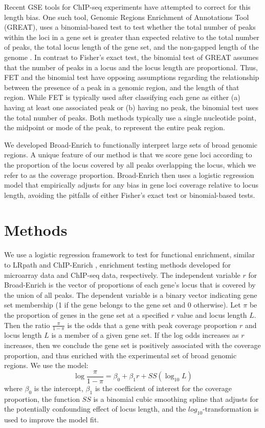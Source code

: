 \documentclass[11pt, oneside]{article}   	%
\begin{document}
Recent GSE tools for ChIP-seq experiments have attempted to correct for this length bias. One such tool, Genomic Regions Enrichment of Annotations Tool (GREAT), uses a binomial-based test to test whether the total number of peaks within the loci in a gene set is greater than expected relative to the total number of peaks, the total locus length of the gene set, and the non-gapped length of the genome \cite{McLean:2010iq}. In contrast to Fisher's exact test, the binomial test of GREAT assumes that the number of peaks in a locus and the locus length are proportional. Thus, FET and the binomial test have opposing assumptions regarding the relationship between the presence of a peak in a genomic region, and the length of that region. While FET is typically used after classifying each gene as either (a) having at least one associated peak or (b) having no peak, the binomial test uses the total number of peaks. Both methods typically use a single nucleotide point, the midpoint or mode of the peak, to represent the entire peak region.

We developed Broad-Enrich to functionally interpret large sets of broad genomic regions. A unique feature of our method is that we score gene loci according to the proportion of the locus covered by all peaks overlapping the locus, which we refer to as the coverage proportion. Broad-Enrich then uses a logistic regression model that empirically adjusts for any bias in gene loci coverage relative to locus length, avoiding the pitfalls of either Fisher's exact test or binomial-based tests.

\section*{Methods}
We use a logistic regression framework to test for functional enrichment, similar to LRpath \cite{Sartor:2008by} and ChIP-Enrich \cite{Welch:2014fb}, enrichment testing methods developed for microarray data and ChIP-seq data, respectively. The independent variable $r$ for Broad-Enrich is the vector of proportions of each gene's locus that is covered by the union of all peaks. The dependent variable is a binary vector indicating gene set membership (1 if the gene belongs to the gene set and 0 otherwise). Let $\pi$ be the proportion of genes in the gene set at a specified $r$ value and locus length $L$. Then the ratio $\frac{\pi}{1 - \pi}$ is the odds that a gene with peak coverage proportion $r$ and locus length $L$ is a member of a given gene set. If the log odds increases as $r$ increases, then we conclude the gene set is positively associated with the coverage proportion, and thus enriched with the experimental set of broad genomic regions. We use the model:
\begin{equation} \label{broadenrich_equation_model}
	\log \frac{\pi}{1 - \pi} = \beta_0 + \beta_1 r + SS (\log_{10} L)
\end{equation}
where $\beta_0$ is the intercept, $\beta_1$ is the coefficient of interest for the coverage proportion, the function $SS$ is a binomial cubic smoothing spline that adjusts for the potentially confounding effect of locus length, and the $log_{10}$-transformation is used to improve the model fit.
\end{document}
